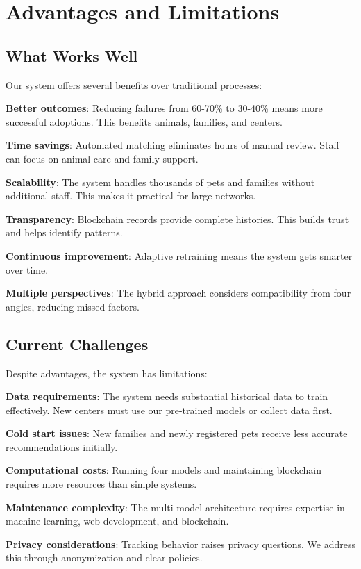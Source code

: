 \documentclass[conference]{IEEEtran}
\begin{document}
\section{Advantages and Limitations}

\subsection{What Works Well}

Our system offers several benefits over traditional processes:

\textbf{Better outcomes}: Reducing failures from 60-70\% to 30-40\% means more successful adoptions. This benefits animals, families, and centers.

\textbf{Time savings}: Automated matching eliminates hours of manual review. Staff can focus on animal care and family support.

\textbf{Scalability}: The system handles thousands of pets and families without additional staff. This makes it practical for large networks.

\textbf{Transparency}: Blockchain records provide complete histories. This builds trust and helps identify patterns.

\textbf{Continuous improvement}: Adaptive retraining means the system gets smarter over time.

\textbf{Multiple perspectives}: The hybrid approach considers compatibility from four angles, reducing missed factors.

\subsection{Current Challenges}

Despite advantages, the system has limitations:

\textbf{Data requirements}: The system needs substantial historical data to train effectively. New centers must use our pre-trained models or collect data first.

\textbf{Cold start issues}: New families and newly registered pets receive less accurate recommendations initially.

\textbf{Computational costs}: Running four models and maintaining blockchain requires more resources than simple systems.

\textbf{Maintenance complexity}: The multi-model architecture requires expertise in machine learning, web development, and blockchain.

\textbf{Privacy considerations}: Tracking behavior raises privacy questions. We address this through anonymization and clear policies.
\end{document}
